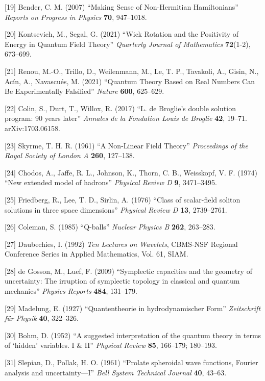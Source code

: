 \documentclass[
]{ltjsarticle}
\begin{document}
{[}19{]} Bender, C. M. (2007) ``Making Sense of Non-Hermitian
Hamiltonians'' \emph{Reports on Progress in Physics} \textbf{70},
947--1018.

{[}20{]} Kontsevich, M., Segal, G. (2021) ``Wick Rotation and the
Positivity of Energy in Quantum Field Theory'' \emph{Quarterly Journal
of Mathematics} \textbf{72}(1-2), 673--699.

{[}21{]} Renou, M.-O., Trillo, D., Weilenmann, M., Le, T. P., Tavakoli,
A., Gisin, N., Acín, A., Navascués, M. (2021) ``Quantum Theory Based on
Real Numbers Can Be Experimentally Falsified'' \emph{Nature}
\textbf{600}, 625--629.

{[}22{]} Colin, S., Durt, T., Willox, R. (2017) ``L. de Broglie's double
solution program: 90 years later'' \emph{Annales de la Fondation Louis
de Broglie} \textbf{42}, 19--71. arXiv:1703.06158.

{[}23{]} Skyrme, T. H. R. (1961) ``A Non-Linear Field Theory''
\emph{Proceedings of the Royal Society of London A} \textbf{260},
127--138.

{[}24{]} Chodos, A., Jaffe, R. L., Johnson, K., Thorn, C. B., Weisskopf,
V. F. (1974) ``New extended model of hadrons'' \emph{Physical Review D}
\textbf{9}, 3471--3495.

{[}25{]} Friedberg, R., Lee, T. D., Sirlin, A. (1976) ``Class of
scalar-field soliton solutions in three space dimensions''
\emph{Physical Review D} \textbf{13}, 2739--2761.

{[}26{]} Coleman, S. (1985) ``Q-balls'' \emph{Nuclear Physics B}
\textbf{262}, 263--283.

{[}27{]} Daubechies, I. (1992) \emph{Ten Lectures on Wavelets}, CBMS-NSF
Regional Conference Series in Applied Mathematics, Vol. 61, SIAM.

{[}28{]} de Gosson, M., Luef, F. (2009) ``Symplectic capacities and the
geometry of uncertainty: The irruption of symplectic topology in
classical and quantum mechanics'' \emph{Physics Reports} \textbf{484},
131--179.

{[}29{]} Madelung, E. (1927) ``Quantentheorie in hydrodynamischer Form''
\emph{Zeitschrift für Physik} \textbf{40}, 322--326.

{[}30{]} Bohm, D. (1952) ``A suggested interpretation of the quantum
theory in terms of `hidden' variables. I \& II'' \emph{Physical Review}
\textbf{85}, 166--179; 180--193.

{[}31{]} Slepian, D., Pollak, H. O. (1961) ``Prolate spheroidal wave
functions, Fourier analysis and uncertainty---I'' \emph{Bell System
Technical Journal} \textbf{40}, 43--63.
\end{document}
